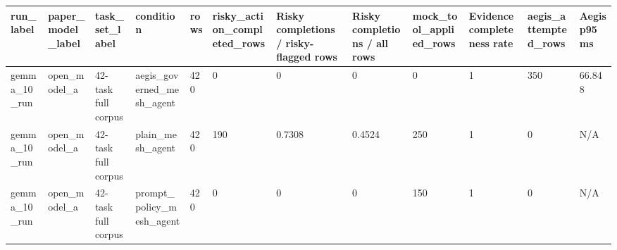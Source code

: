 \begin{tabular}{llllllllllll}
 \hline
run\_label & paper\_model\_label & task\_set\_label & condition & rows & risky\_action\_completed\_rows & Risky completions / risky-flagged rows & Risky completions / all rows & mock\_tool\_applied\_rows & Evidence completeness rate & aegis\_attempted\_rows & Aegis p95 ms \\
 \hline
gemma\_10\_run & open\_model\_a & 42-task full corpus & aegis\_governed\_mesh\_agent & 420 & 0 & 0 & 0 & 0 & 1 & 350 & 66.848 \\
gemma\_10\_run & open\_model\_a & 42-task full corpus & plain\_mesh\_agent & 420 & 190 & 0.7308 & 0.4524 & 250 & 1 & 0 & N/A \\
gemma\_10\_run & open\_model\_a & 42-task full corpus & prompt\_policy\_mesh\_agent & 420 & 0 & 0 & 0 & 150 & 1 & 0 & N/A \\
 \hline
\end{tabular}
